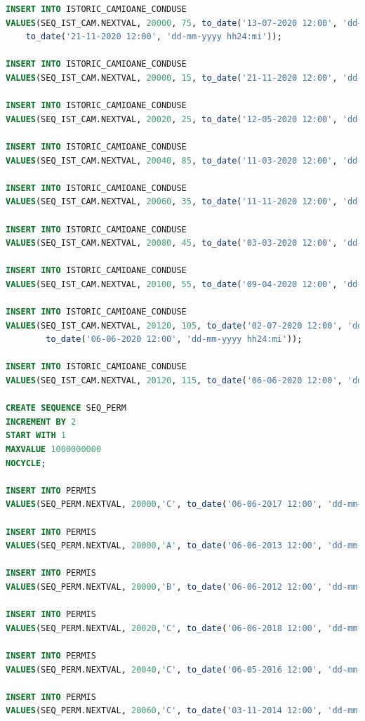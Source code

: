 \documentclass[12pt, a4paper]{article}
\begin{document}
\begin{lstlisting}[language=SQL]
INSERT INTO ISTORIC_CAMIOANE_CONDUSE
VALUES(SEQ_IST_CAM.NEXTVAL, 20000, 75, to_date('13-07-2020 12:00', 'dd-mm-yyyy hh24:mi'), 
    to_date('21-11-2020 12:00', 'dd-mm-yyyy hh24:mi'));

INSERT INTO ISTORIC_CAMIOANE_CONDUSE
VALUES(SEQ_IST_CAM.NEXTVAL, 20000, 15, to_date('21-11-2020 12:00', 'dd-mm-yyyy hh24:mi'), null);

INSERT INTO ISTORIC_CAMIOANE_CONDUSE
VALUES(SEQ_IST_CAM.NEXTVAL, 20020, 25, to_date('12-05-2020 12:00', 'dd-mm-yyyy hh24:mi'), null);

INSERT INTO ISTORIC_CAMIOANE_CONDUSE
VALUES(SEQ_IST_CAM.NEXTVAL, 20040, 85, to_date('11-03-2020 12:00', 'dd-mm-yyyy hh24:mi'), null);

INSERT INTO ISTORIC_CAMIOANE_CONDUSE
VALUES(SEQ_IST_CAM.NEXTVAL, 20060, 35, to_date('11-11-2020 12:00', 'dd-mm-yyyy hh24:mi'), null);

INSERT INTO ISTORIC_CAMIOANE_CONDUSE
VALUES(SEQ_IST_CAM.NEXTVAL, 20080, 45, to_date('03-03-2020 12:00', 'dd-mm-yyyy hh24:mi'), null);

INSERT INTO ISTORIC_CAMIOANE_CONDUSE
VALUES(SEQ_IST_CAM.NEXTVAL, 20100, 55, to_date('09-04-2020 12:00', 'dd-mm-yyyy hh24:mi'), null);

INSERT INTO ISTORIC_CAMIOANE_CONDUSE
VALUES(SEQ_IST_CAM.NEXTVAL, 20120, 105, to_date('02-07-2020 12:00', 'dd-mm-yyyy hh24:mi'), 
        to_date('06-06-2020 12:00', 'dd-mm-yyyy hh24:mi'));

INSERT INTO ISTORIC_CAMIOANE_CONDUSE
VALUES(SEQ_IST_CAM.NEXTVAL, 20120, 115, to_date('06-06-2020 12:00', 'dd-mm-yyyy hh24:mi'), null);

CREATE SEQUENCE SEQ_PERM
INCREMENT BY 2
START WITH 1
MAXVALUE 1000000000
NOCYCLE;

INSERT INTO PERMIS
VALUES(SEQ_PERM.NEXTVAL, 20000,'C', to_date('06-06-2017 12:00', 'dd-mm-yyyy hh24:mi'));

INSERT INTO PERMIS
VALUES(SEQ_PERM.NEXTVAL, 20000,'A', to_date('06-06-2013 12:00', 'dd-mm-yyyy hh24:mi'));

INSERT INTO PERMIS
VALUES(SEQ_PERM.NEXTVAL, 20000,'B', to_date('06-06-2012 12:00', 'dd-mm-yyyy hh24:mi'));

INSERT INTO PERMIS
VALUES(SEQ_PERM.NEXTVAL, 20020,'C', to_date('06-06-2018 12:00', 'dd-mm-yyyy hh24:mi'));

INSERT INTO PERMIS
VALUES(SEQ_PERM.NEXTVAL, 20040,'C', to_date('06-05-2016 12:00', 'dd-mm-yyyy hh24:mi'));

INSERT INTO PERMIS
VALUES(SEQ_PERM.NEXTVAL, 20060,'C', to_date('03-11-2014 12:00', 'dd-mm-yyyy hh24:mi'));


\end{lstlisting}
\end{document}

